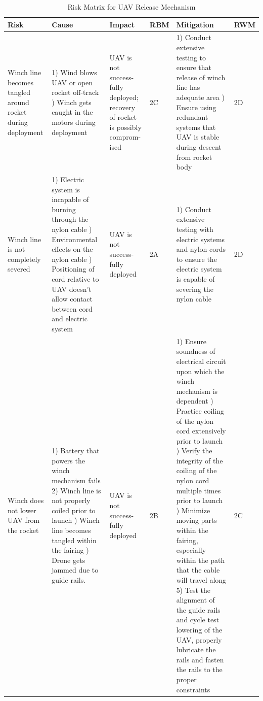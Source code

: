 		\begin{table}[H]
    \label{UAV Release Mechanism}
    {\footnotesize
    \caption{Risk Matrix for UAV Release Mechanism}
    \centering
    \begin{tabularx}{\linewidth}{XXXlXl}
    \toprule
    \textbf{Risk}                                            & \textbf{Cause}                                                                                                                 & \textbf{Impact}                                                                                                                           & \textbf{RBM}  & \textbf{Mitigation}                                                                                                                                                                                     & \textbf{RWM} \\
    \midrule
    Winch line becomes tangled around rocket during deployment & 1) Wind blows UAV or open rocket off-track \newline 2) Winch gets caught in the motors during deployment & UAV is not success-fully deployed; recovery of rocket is possibly comprom-ised & \cellcolor{orange!25} 2C & 1) Conduct extensive testing to ensure that release of winch line has adequate area \newline 2) Ensure using redundant systems that UAV is stable during descent from rocket body & \cellcolor{orange!25} 2D \\
    Winch line is not completely severed & 1) Electric system is incapable of burning through the nylon cable \newline 2) Environmental effects on the nylon cable \newline 3) Positioning of cord relative to UAV doesn’t allow contact between cord and electric system & UAV is not success-fully deployed & \cellcolor{red!25} 2A & 1) Conduct extensive testing with electric systems and nylon cords to ensure the electric system is capable of severing the nylon cable & \cellcolor{orange!25} 2D \\
    Winch does not lower UAV from the rocket & 1) Battery that powers the winch mechanism fails 2) Winch line is not properly coiled prior to launch \newline 3) Winch line becomes tangled within the fairing \newline 4) Drone gets jammed due to guide rails. & UAV is not success-fully deployed & \cellcolor{red!25} 2B & 1) Ensure soundness of electrical circuit upon which the winch mechanism is dependent \newline 2) Practice coiling of the nylon cord extensively prior to launch \newline 3) Verify the integrity of the coiling of the nylon cord multiple times prior to launch \newline 4) Minimize moving parts within the fairing, especially within the path that the cable will travel along 5) Test the alignment of the guide rails and cycle test lowering of the UAV, properly lubricate the rails and fasten the rails to the proper constraints & \cellcolor{orange!25} 2C \\

\end{tabularx}}
\end{table}
